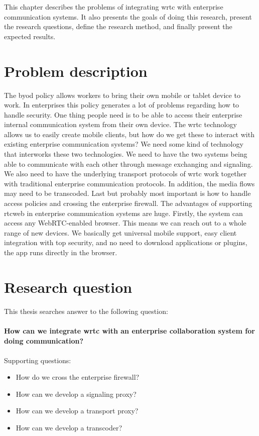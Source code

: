 
This chapter describes the problems of integrating \gls{wrtc} with enterprise communication systems. It also presents the goals of doing this research, present the research questions, define the research method, and finally present the expected results.

\section{Problem description}
The \gls{byod} policy allows workers to bring their own mobile or tablet device to work. In enterprises this policy generates a lot of problems regarding how to handle security. One thing people need is to be able to access their enterprise internal communication system from their own device. The \gls{wrtc} technology allows us to easily create mobile clients, but how do we get these to interact with existing enterprise communication systems? We need some kind of technology that interworks these two technologies. We need to have the two systems being able to communicate with each other through message exchanging and signaling. We also need to have the underlying transport protocols of \gls{wrtc} work together with traditional enterprise communication protocols. In addition, the media flows may need to be transcoded. Last but probably most important is how to handle access policies and crossing the enterprise firewall. The advantages of supporting \gls{rtcweb} in enterprise communication systems are huge. Firstly, the system can access any WebRTC-enabled browser. This means we can reach out to a whole range of new devices. We basically get universal mobile support, easy client integration with top security, and no need to download applications or plugins, the app runs directly in the browser.

\section{Research question}
This thesis searches answer to the following question:
\\
\\
\textbf{How can we integrate \gls{wrtc} with an enterprise collaboration system for doing communication?}
\\
\\
Supporting questions:

\begin{itemize}
\item How do we cross the enterprise firewall?
\item How can we develop a signaling proxy?
\item How can we develop a transport proxy?
\item How can we develop a transcoder?
\end{itemize}

